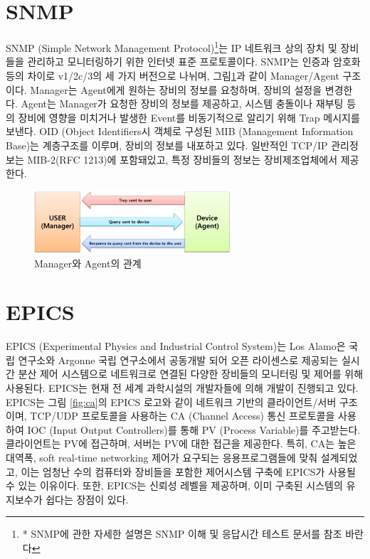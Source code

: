 \documentclass[11pt
  , a4paper
  , article
  , oneside
]{memoir}
\begin{document}
\section{SNMP}
SNMP (Simple Network Management Protocol)\footnote{* SNMP에 관한 자세한 설명은 SNMP 이해 및 응답시간 테스트 문서를 참조 바란다}는 IP 네트워크 상의 장치 및 장비들을 관리하고 모니터링하기 위한 인터넷 표준 프로토콜이다\citep{snmp}. SNMP는 인증과 암호화 등의 차이로 v1/2c/3의 세 가지 버전으로 나뉘며, 그림\ref{fig:relationship_m_a}과 같이 Manager/Agent 구조이다\citep{snmpm_a}. Manager는 Agent에게 원하는 장비의 정보를 요청하며, 장비의 설정을 변경한다. Agent는 Manager가 요청한 장비의 정보를 제공하고, 시스템 충돌이나 재부팅 등의 장비에 영향을 미치거나 발생한 Event를 비동기적으로 알리기 위해 Trap 메시지를 보낸다. OID (Object Identifiers시 객체로 구성된 MIB (Management Information Base)는 계층구조를 이루며, 장비의 정보를 내포하고 있다. 일반적인 TCP/IP 관리정보는 MIB-2(RFC 1213)에 포함돼있고, 특정 장비들의 정보는 장비제조업체에서 제공한다. 

\begin{figure}[h!]
  \centering
  \includegraphics[width=0.65\textwidth]{./images/relationship_m_a.eps}
  \caption{Manager와 Agent의 관계}
  \label{fig:relationship_m_a}   
\end{figure}

\hfill

\section{EPICS}
EPICS (Experimental Physics and Industrial Control System)는 Los Alamo은 국립 연구소와 Argonne 국립 연구소에서 공동개발 되어 오픈 라이센스로 제공되는 실시간 분산 제어 시스템으로 네트워크로 연결된 다양한 장비들의 모니터링 및 제어를 위해 사용된다. EPICS는 현재 전 세계 과학시설의 개발자들에 의해 개발이 진행되고 있다. EPICS는 그림 \ref{fig:ca}의 EPICS 로고와 같이 네트워크 기반의 클라이언트/서버 구조이며, TCP/UDP 프로토콜을 사용하는 CA (Channel Access) 통신 프로토콜을 사용하여 IOC (Input Output Controllers)를 통해 PV (Process Variable)를 주고받는다. 클라이언트는 PV에 접근하며, 서버는 PV에 대한 접근을 제공한다. 특히, CA는 높은 대역폭, soft real-time networking 제어가 요구되는 응용프로그램들에 맞춰 설계되었고, 이는 엄청난 수의 컴퓨터와 장비들을 포함한 제어시스템 구축에 EPICS가 사용될 수 있는 이유이다. 또한, EPICS는 신뢰성 레벨을 제공하며, 이미 구축된 시스템의 유지보수가 쉽다는 장점이 있다\citep{epics}. 
\end{document}
